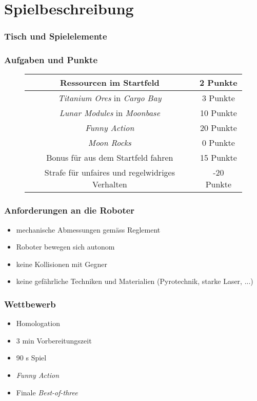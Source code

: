 \section{Spielbeschreibung}

\begin{frame}
	\frametitle{Tisch und Spielelemente}
	
\end{frame}

\begin{frame}
	\frametitle{Aufgaben und Punkte}
	
	\begin{figure}[H]
		\centering
		\begin{tabular}{|c|c|}
			\hline
			Ressourcen im Startfeld & 2 Punkte\\
			\hline
			\textit{Titanium Ores} in \textit{Cargo Bay} & 3 Punkte\\
			\hline
			\textit{Lunar Modules} in \textit{Moonbase} & 10 Punkte\\
			\hline
			\textit{Funny Action} & 20 Punkte\\
			\hline
			\hline
			\textit{Moon Rocks} & 0 Punkte\\
			\hline
			Bonus für aus dem Startfeld fahren & 15 Punkte\\
			\hline
			Strafe für unfaires und regelwidriges Verhalten & -20 Punkte\\
			\hline
		\end{tabular}	
	\end{figure}
\end{frame}

\begin{frame}
	\frametitle{Anforderungen an die Roboter}
	
	\begin{itemize}
		\item mechanische Abmessungen gemäss Reglement
		\item Roboter bewegen sich autonom
		\item keine Kollisionen mit Gegner
		\item keine gefährliche Techniken und Materialien (Pyrotechnik, starke Laser, ...)
	\end{itemize}
	
\end{frame}

\begin{frame}
	\frametitle{Wettbewerb}
	
	\begin{itemize}
		\item Homologation
	\end{itemize}
	\begin{itemize}
		\item 3 min Vorbereitungszeit
		\item 90 s Spiel
		\item \textit{Funny Action}
	\end{itemize}
	\begin{itemize}
		\item Finale \textit{Best-of-three}
	\end{itemize}
\end{frame}
